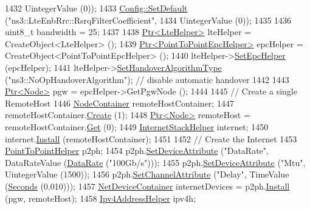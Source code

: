 \begin{DoxyCode}
1432                       UintegerValue (0));
1433   \hyperlink{group__config_ga2e7882df849d8ba4aaad31c934c40c06}{Config::SetDefault} (\textcolor{stringliteral}{"ns3::LteEnbRrc::RsrqFilterCoefficient"},
1434                       UintegerValue (0));
1435 
1436   uint8\_t bandwidth = 25;
1437 
1438   \hyperlink{classns3_1_1Ptr}{Ptr<LteHelper>} lteHelper = CreateObject<LteHelper> ();
1439   \hyperlink{classns3_1_1Ptr}{Ptr<PointToPointEpcHelper>} epcHelper = CreateObject<PointToPointEpcHelper> ();
1440   lteHelper->\hyperlink{classns3_1_1LteHelper_a324079a1ccd54ce949786b83d6b95915}{SetEpcHelper} (epcHelper);
1441   lteHelper->\hyperlink{classns3_1_1LteHelper_a6301630b8a7082043efff2a7aaaa1d20}{SetHandoverAlgorithmType} (\textcolor{stringliteral}{"ns3::NoOpHandoverAlgorithm"}); \textcolor{comment}{// disable
       automatic handover}
1442 
1443   \hyperlink{classns3_1_1Ptr}{Ptr<Node>} pgw = epcHelper->GetPgwNode ();
1444 
1445   \textcolor{comment}{// Create a single RemoteHost}
1446   \hyperlink{classns3_1_1NodeContainer}{NodeContainer} remoteHostContainer;
1447   remoteHostContainer.\hyperlink{classns3_1_1NodeContainer_a787f059e2813e8b951cc6914d11dfe69}{Create} (1);
1448   \hyperlink{classns3_1_1Ptr}{Ptr<Node>} remoteHost = remoteHostContainer.\hyperlink{classns3_1_1NodeContainer_a9ed96e2ecc22e0f5a3d4842eb9bf90bf}{Get} (0);
1449   \hyperlink{classns3_1_1InternetStackHelper}{InternetStackHelper} internet;
1450   internet.\hyperlink{classns3_1_1InternetStackHelper_a6645b412f31283d2d9bc3d8a95cebbc0}{Install} (remoteHostContainer);
1451 
1452   \textcolor{comment}{// Create the Internet}
1453   \hyperlink{classns3_1_1PointToPointHelper}{PointToPointHelper} p2ph;
1454   p2ph.\hyperlink{classns3_1_1PointToPointHelper_a4577f5ab8c387e5528af2e0fbab1152e}{SetDeviceAttribute} (\textcolor{stringliteral}{"DataRate"}, DataRateValue (\hyperlink{classns3_1_1DataRate}{DataRate} (\textcolor{stringliteral}{"100Gb/s"})));
1455   p2ph.\hyperlink{classns3_1_1PointToPointHelper_a4577f5ab8c387e5528af2e0fbab1152e}{SetDeviceAttribute} (\textcolor{stringliteral}{"Mtu"}, UintegerValue (1500));
1456   p2ph.\hyperlink{classns3_1_1PointToPointHelper_a6b5317fd17fb61e5a53f8d66a90b63b9}{SetChannelAttribute} (\textcolor{stringliteral}{"Delay"}, TimeValue (\hyperlink{group__timecivil_ga33c34b816f8ff6628e33d5c8e9713b9e}{Seconds} (0.010)));
1457   \hyperlink{classns3_1_1NetDeviceContainer}{NetDeviceContainer} internetDevices = p2ph.\hyperlink{classns3_1_1PointToPointHelper_ab9162fea3e88722666fed1106df1f9ec}{Install} (pgw, remoteHost);
1458   \hyperlink{classns3_1_1Ipv4AddressHelper}{Ipv4AddressHelper} ipv4h;

\end{DoxyCode}
